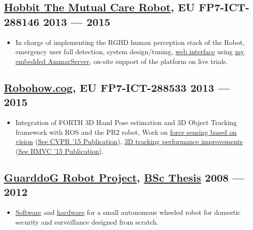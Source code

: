 \documentclass[a4,8pt]{article}
\newenvironment{zitemize}{
\begin{itemize}\itemsep0pt \parskip0pt \parsep1pt}
{\end{itemize}\vspace{-0.5cm}}
\begin{document}
\subsection*{\href{http://hobbit.acin.tuwien.ac.at/}{Hobbit The Mutual Care Robot}, {\normalsize\normalfont EU FP7-ICT-288146} \hfill 2013 --- 2015} 
    \begin{zitemize}
        \item In charge of implementing the RGBD human perception stack of the Robot, emergency user fall detection, system design/tuning, \href{https://www.youtube.com/watch?v=41_8ktacxt8}{web interface} using \href{https://github.com/AmmarkoV/AmmarServer/}{my embedded AmmarServer}, on-site support of the platform on live trials. 
    \end{zitemize}

\subsection*{\href{https://cordis.europa.eu/docs/projects/cnect/3/288533/080/deliverables/001-d21.pdf}{Robohow.cog}, {\normalsize\normalfont EU FP7-ICT-288533} \hfill 2013 --- 2015} 
    \begin{zitemize}
        \item Integration of FORTH 3D Hand Pose estimation and 3D Object Tracking framework with ROS and the PR2 robot, Work on \href{https://www.youtube.com/watch?v=C4k-FPWM1t0}{force sensing based on vision} (\href{http://users.ics.forth.gr/~argyros/mypapers/2015_06_CVPR_fsv.pdf}{See CVPR '15 Publication}), \href{https://www.youtube.com/watch?v=nPru6PpWrK4}{3D tracking performance improvements} (\href{http://users.ics.forth.gr/~argyros/mypapers/2015_09_BMVC_fect.pdf}{See BMVC '15 Publication}).
    \end{zitemize}

\subsection*{\href{https://github.com/AmmarkoV/RoboVision}{GuarddoG Robot Project}, {\normalsize\normalfont \href{https://github.com/AmmarkoV/RoboVision/blob/master/Documentation/GuarDDoG_RoboVision.pdf}{BSc Thesis}} \hfill 2008 --- 2012} 
    \begin{zitemize}
        \item \href{https://github.com/AmmarkoV/RoboVision}{Software} and \href{https://github.com/AmmarkoV/RoboVision/blob/master/Documentation/GuarDDoG_RoboVision.pdf}{hardware} for a small autonomous wheeled robot for domestic security and surveillance designed from scratch.
    \end{zitemize}
\end{document}
